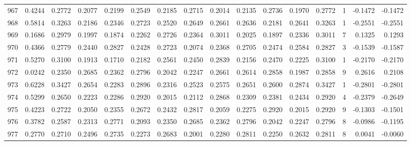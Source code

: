 \begin{tabular}{lrrrrrrrrrrrrrrr}
967 &      0.4244 &  0.2772 &  0.2077 &  0.2199 &  0.2549 &  0.2185 &  0.2715 &  0.2014 &  0.2135 &  0.2736 &   0.1970 &     0.2772 &      1 &                   -0.1472 &                    -0.1472 \\
968 &      0.5814 &  0.3263 &  0.2186 &  0.2346 &  0.2723 &  0.2520 &  0.2649 &  0.2661 &  0.2636 &  0.2181 &   0.2641 &     0.3263 &      1 &                   -0.2551 &                    -0.2551 \\
969 &      0.1686 &  0.2979 &  0.1997 &  0.1874 &  0.2262 &  0.2726 &  0.2364 &  0.3011 &  0.2025 &  0.1897 &   0.2336 &     0.3011 &      7 &                    0.1325 &                     0.1293 \\
970 &      0.4366 &  0.2779 &  0.2440 &  0.2827 &  0.2428 &  0.2723 &  0.2074 &  0.2368 &  0.2705 &  0.2474 &   0.2584 &     0.2827 &      3 &                   -0.1539 &                    -0.1587 \\
971 &      0.5270 &  0.3100 &  0.1913 &  0.1710 &  0.2182 &  0.2561 &  0.2450 &  0.2839 &  0.2156 &  0.2470 &   0.2225 &     0.3100 &      1 &                   -0.2170 &                    -0.2170 \\
972 &      0.0242 &  0.2350 &  0.2685 &  0.2362 &  0.2796 &  0.2042 &  0.2247 &  0.2661 &  0.2614 &  0.2858 &   0.1987 &     0.2858 &      9 &                    0.2616 &                     0.2108 \\
973 &      0.6228 &  0.3427 &  0.2654 &  0.2283 &  0.2896 &  0.2316 &  0.2523 &  0.2575 &  0.2651 &  0.2600 &   0.2874 &     0.3427 &      1 &                   -0.2801 &                    -0.2801 \\
974 &      0.5299 &  0.2650 &  0.2223 &  0.2286 &  0.2920 &  0.2015 &  0.2112 &  0.2868 &  0.2309 &  0.2381 &   0.2434 &     0.2920 &      4 &                   -0.2379 &                    -0.2649 \\
975 &      0.4223 &  0.2722 &  0.2050 &  0.2355 &  0.2672 &  0.2432 &  0.2817 &  0.2059 &  0.2275 &  0.2920 &   0.2015 &     0.2920 &      9 &                   -0.1303 &                    -0.1501 \\
976 &      0.3782 &  0.2587 &  0.2313 &  0.2771 &  0.2093 &  0.2350 &  0.2685 &  0.2362 &  0.2796 &  0.2042 &   0.2247 &     0.2796 &      8 &                   -0.0986 &                    -0.1195 \\
977 &      0.2770 &  0.2710 &  0.2496 &  0.2735 &  0.2273 &  0.2683 &  0.2001 &  0.2280 &  0.2811 &  0.2250 &   0.2632 &     0.2811 &      8 &                    0.0041 &                    -0.0060 \\

\end{tabular}
